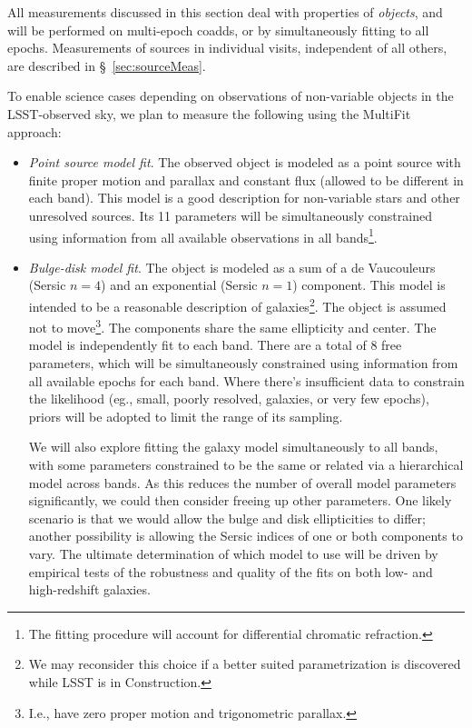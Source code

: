 \documentclass[SE,lsstdraft,toc]{lsstdoc}
\begin{document}
All measurements discussed in this section deal with properties of \emph{objects}, and will be performed on multi-epoch coadds, or by simultaneously fitting to all epochs. Measurements of sources in individual visits, independent of all others, are described in \S~\ref{sec:sourceMeas}.

To enable science cases depending on observations of non-variable objects in the LSST-observed sky, we plan to measure the following using the MultiFit approach:
%
\begin{itemize}
    \item \emph{Point source model fit}. The observed object is modeled as a point source with finite proper motion and parallax and constant flux (allowed to be different in each band).  This model is a good description for non-variable stars and other unresolved sources. Its 11 parameters will be simultaneously constrained using information from all available observations in all bands\footnote{The fitting procedure will account for differential chromatic refraction.}.
    \item \emph{Bulge-disk model fit}.  The object is modeled as a sum of a de Vaucouleurs (Sersic $n=4$) and an exponential (Sersic $n=1$) component. This model is intended to be a reasonable description of galaxies\footnote{We may reconsider this choice if a better suited parametrization is discovered while LSST is in Construction.}. The object is assumed not to move\footnote{I.e., have zero proper motion and trigonometric parallax.}. The components share the same ellipticity and center. The model is independently fit to each band. There are a total of 8 free parameters, which will be simultaneously constrained using information from all available epochs for each band. Where there's insufficient data to constrain the likelihood (eg., small, poorly resolved, galaxies, or very few epochs), priors will be adopted to limit the range of its sampling.

We will also explore fitting the galaxy model simultaneously to all bands, with some parameters constrained to be the same or related via a hierarchical model across bands.  As this reduces the number of overall model parameters significantly, we could then consider freeing up other parameters. One likely scenario is that we would allow the bulge and disk ellipticities to differ; another possibility is allowing the Sersic indices of one or both components to vary.  The ultimate determination of which model to use will be driven by empirical tests of the robustness and quality of the fits on both low- and high-redshift galaxies.


\end{itemize}
\end{document}
